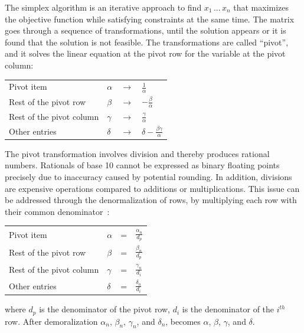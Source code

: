 \documentclass[logo,bsc,singlespacing,parskip]{infthesis}
\begin{document}
The simplex algorithm is an iterative approach to find \begin{math} x_1 \, ...
\, x_n\end{math} that maximizes the objective function while satisfying
constraints at the same time. The matrix goes through a sequence of
transformations, until the solution appears or it is found that the solution is
not feasible. The transformations are called ``pivot'', and it solves the linear
equation at the pivot row for the variable at the pivot column: 
\vspace*{-4mm}
\begin{table}[H]
\begin{center}
\begin{tabular}{llll}
Pivot item           & $\alpha$ & $\rightarrow$ & $\frac{1}{\alpha}$            \\
Rest of the pivot row    & $\beta$  & $\rightarrow$ & $-\frac{\beta}{\alpha}$            \\
Rest of the pivot column& $\gamma$ & $\rightarrow$ & $\frac{\gamma}{\alpha}$            \\
Other entries         & $\delta$ & $\rightarrow$ & $\delta - \frac{\beta\gamma}{\alpha}$  
\end{tabular}
\end{center}
\end{table}
\vspace*{-8mm}

The pivot transformation involves division and thereby produces rational
numbers. Rationals of base 10 cannot be expressed as binary floating points
precisely due to inaccuracy caused by potential rounding. In addition, divisions
are expensive operations compared to additions or multiplications. This issue
can be addressed through the denormalization of rows, by multiplying each row with
their common denominator~\cite{FPL1}: 
\vspace*{-4mm}
\begin{table}[H]
\begin{center}
\begin{tabular}{llll}
Pivot item           & $\alpha$ & = & $\frac{\alpha_n}{d_p}$            \\
Rest of the pivot row    & $\beta$  & = & $\frac{\beta_n}{d_p}$            \\
Rest of the pivot column& $\gamma$ & = & $\frac{\gamma_n}{d_i}$            \\
Other entries         & $\delta$ & = & $\frac{\delta_n}{d_i}$  
\end{tabular}
\end{center}
\end{table}
\vspace*{-8mm}
where $d_p$ is the denominator of the pivot row, $d_i$ is the denominator of the
$i^{th}$ row. After demoralization $\alpha_n$, $\beta_n$, $\gamma_n$, and
$\delta_n$, becomes $\alpha$, $\beta$, $\gamma$, and $\delta$.
\end{document}
